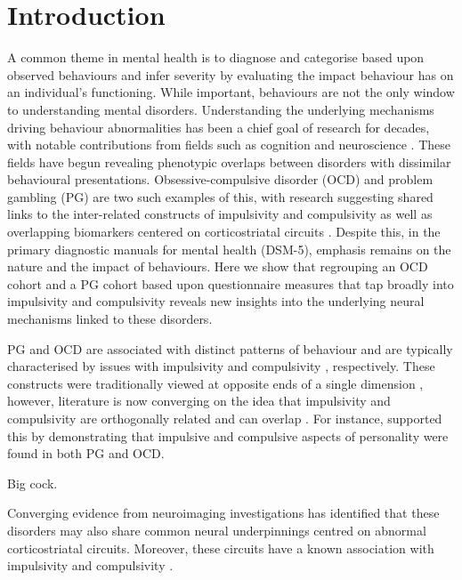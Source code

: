 \section{Introduction}

A common theme in mental health is to diagnose and categorise based upon observed behaviours and infer severity by evaluating the impact behaviour has on an individual's functioning. While important, behaviours are not the only window to understanding mental disorders. Understanding the underlying mechanisms driving behaviour abnormalities has been a chief goal of research for decades, with notable contributions from fields such as cognition and neuroscience \cite{Frank_2015}. These fields have begun revealing phenotypic overlaps between disorders with dissimilar behavioural presentations. Obsessive-compulsive disorder (OCD) and problem gambling (PG) are two such examples of this, with research suggesting shared links to the inter-related constructs of impulsivity and compulsivity \cite{Tavares_2007} as well as overlapping biomarkers centered on corticostriatal circuits \cite{van_Holst_2010,Harrison_2009,Harrison_2013}. Despite this, in the primary diagnostic manuals for mental health (DSM-5), emphasis remains on the nature and the impact of behaviours. Here we show that regrouping an OCD cohort and a PG cohort based upon questionnaire measures that tap broadly into impulsivity and compulsivity reveals new insights into the underlying neural mechanisms linked to these disorders.


PG and OCD are associated with distinct patterns of behaviour and are typically characterised by issues with impulsivity \cite{Goudriaan_2004} and compulsivity \cite{Stein_1994}, respectively. These constructs were traditionally viewed at opposite ends of a single dimension \cite{Fineberg_2009}, however, literature is now converging on the idea that impulsivity and compulsivity are orthogonally related and can overlap \cite{Fineberg_2009,Fontenelle_2011}. For instance, \citet{Tavares_2007} supported this by demonstrating that impulsive and compulsive aspects of personality were found in both PG and OCD.

Big cock.


Converging evidence from neuroimaging investigations has identified that these disorders may also share common neural underpinnings centred on abnormal corticostriatal circuits. Moreover, these circuits have a known association with impulsivity and compulsivity \cite{Torregrossa2008}.





